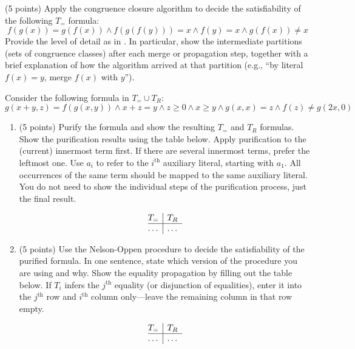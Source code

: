 \documentclass{handout}
\begin{document}
\begin{questions}
\item (5 points) \label{prob:smt:first} Apply the congruence closure algorithm
to decide the satisfiability of the following $T_=$ formula:
\[
f(g(x)) = g(f(x)) \wedge f(g(f(y))) = x \wedge f(y) = x \wedge g(f(x)) \neq x
\]
Provide the level of detail as in .  In particular, show the
intermediate partitions (sets of congruence classes) after each merge or
propagation step, together with a brief explanation of how the algorithm arrived
at that partition (e.g., ``by literal $f(x) = y$, merge $f(x)$ with $y$'').
\label{prob:first}




\item Consider the following formula in $T_=\cup T_R$:
\[
g(x + y, z) = f(g(x, y)) \wedge x + z = y \wedge z \geq 0 \wedge x \geq y \wedge g(x, x) = z \wedge f(z) \neq g(2x, 0)
\]

\begin{enumerate}
\item (5 points) Purify the formula and show the resulting $T_=$ and $T_R$
formulas. Show the purification results using the table below. Apply
purification to the (current) innermost term first.  If there are several
innermost terms, prefer the leftmost one.  Use $a_i$ to refer to the
$i^\text{th}$ auxiliary literal, starting with $a_1$.  All occurrences of the
same term should be mapped to the same auxiliary literal. You do not need to
show the individual steps of the purification process, just the final result.

\[
\begin{array}{@{}l|l}
T_=           & T_R\\ \hline
\ldots & \ldots \\
\end{array}
\]



\item (5 points) Use the Nelson-Oppen procedure to decide the satisfiability of
the purified formula.  In one sentence, state which version of the procedure you
are using and why.  Show the equality propagation  by filling out the table
below.  If $T_i$ infers the $j^\text{th}$ equality (or disjunction of
equalities), enter it into the $j^\text{th}$ row and $i^\text{th}$ column
only---leave the remaining column in that row empty.

\[
\begin{array}{@{}l|l}
T_= & T_R\\ \hline
\ldots & \ldots \\
\end{array}
\]



\end{enumerate}
\end{questions}
\end{document}

